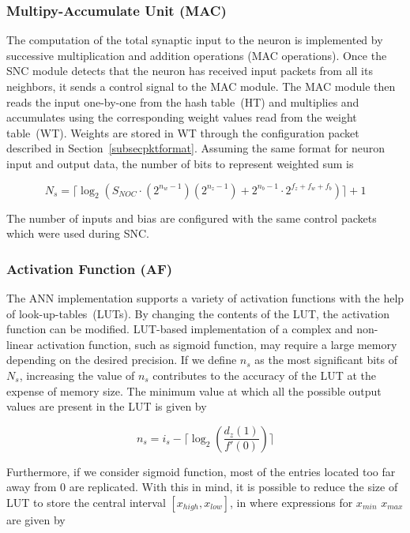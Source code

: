 \subsubsection{\bf Multipy-Accumulate Unit (MAC)}
The computation of the total synaptic input to the neuron is implemented by successive multiplication and addition operations (MAC operations).
Once the SNC module detects that the neuron has received input packets from all its neighbors, it sends a control signal to the MAC module.
The MAC module then reads the input one-by-one from the hash table~(HT) and multiplies and accumulates using the corresponding weight values read from the weight table~(WT). 
Weights are stored in WT through the configuration packet described in Section~\ref{subsecpktformat}. 
Assuming the same format for neuron input and output data, the number of bits to represent weighted sum is

\begin{equation}
N_{s}=\lceil\log_{2}(S_{NOC}\cdot (2^{n_{w}-1})(2^{n_{z}-1})+2^{n_{b}-1}\cdot 2^{f_{z}+f_{w}+f_{b}})\rceil+1
\label{equation:Ns}
\end{equation}

The number of inputs and bias are configured with the same control packets which were used during SNC.  

\subsubsection{\bf Activation Function (AF)}
The ANN implementation supports a variety of activation functions with the help of look-up-tables~(LUTs).
By changing the contents of the LUT, the activation function can be modified.
LUT-based implementation of a complex and non-linear activation function, such as sigmoid function, may require a large memory depending on the desired precision.  
If we define $n_{s}$ as the most significant bits of $N_{s}$, increasing the value of $n_{s}$ contributes to the accuracy of the LUT at the expense of memory size. 
The minimum value at which all the possible output values are present in the LUT is given by

\begin{equation}
n_{s}=i_{s}-\lceil\log_{2}(\frac{d_{z}(1)}{{f}'(0)})\rceil
\label{equation:ns}
\end{equation}

Furthermore, if we consider sigmoid function, most of the entries located too far away from 0 are replicated. 
With this in mind, it is possible to reduce the size of LUT to store the central interval $[x_{high}, x_{low}]$, in where expressions for $x_{min}$ $x_{max}$ are given by

